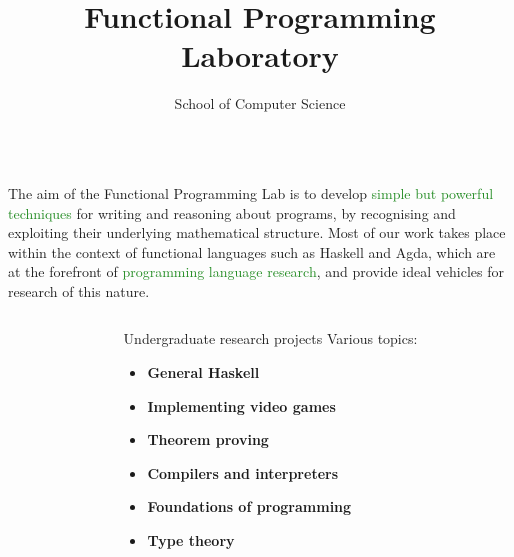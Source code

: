 \documentclass[final]{beamer}
\title{\Large{Functional Programming Laboratory}}
\author{School of Computer Science}
\institute{University of Nottingham}
\newlength{\sepwid}
\newlength{\onecolwid}
\newlength{\threecolwid}
\newcommand{\uuxg}[1]{\textcolor{ForestGreen}{#1}}
\begin{document}
%
%
%
\begin{frame}[t]\vspace{-2cm}
\begin{columns}[t]



\begin{column}{\threecolwid}

	\begin{center}
	The aim of the Functional Programming Lab is to develop \uuxg{simple but powerful techniques} for \textcolor{uuxblue}{writing} and \textcolor{uuxblue}{reasoning about programs}, by recognising and exploiting their \textcolor{uuxblue}{underlying mathematical structure}. Most of our work takes place within the context of \textcolor{uuxblue}{functional languages} such as \textcolor{uuxblue}{Haskell} and \textcolor{uuxblue}{Agda}, which are at the forefront of \uuxg{programming language research}, and provide ideal vehicles for research of this nature. 
\end{center}

 \begin{column}{\sepwid}\end{column}			%

\end{column}
\end{columns}

\begin{columns}[t]
    \begin{column}{\sepwid}\end{column}			%


\begin{column}{\onecolwid}


\begin{block}{Undergraduate research projects}
Various topics: \\[0.3cm]
\begin{itemize}
	\item \textbf{General Haskell} 
	\item \textbf{Implementing video games}
	\item \textbf{Theorem proving} 
	\item \textbf{Compilers and interpreters} 
	\item \textbf{Foundations of programming}
	\item \textbf{Type theory}
\end{itemize}
\end{block}



\end{column}
\end{columns}
\end{frame}
\end{document}
